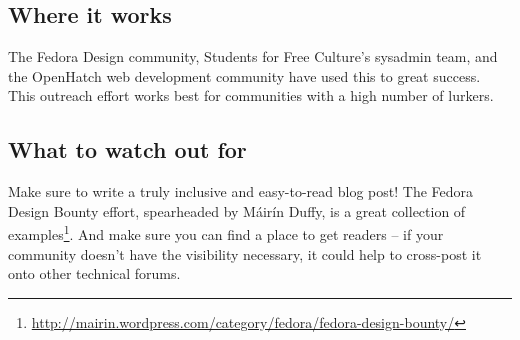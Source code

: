 \subsection{Where it works}
The Fedora Design community, Students for Free Culture’s sysadmin team, and the OpenHatch web development community have used this to great success. This outreach effort works best for communities with a high number of lurkers.

\subsection{What to watch out for}
Make sure to write a truly inclusive and easy-to-read blog post! The Fedora Design Bounty effort, spearheaded by Máirín Duffy, is a great collection of examples\footnote{\url{http://mairin.wordpress.com/category/fedora/fedora-design-bounty/}}. And make sure you can find a place to get readers -- if your community doesn’t have the visibility necessary, it could help to cross-post it onto other technical forums.